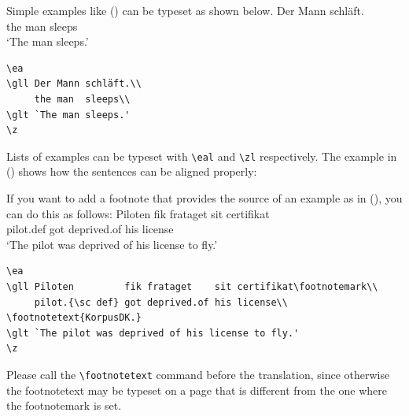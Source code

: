 Simple examples like () can be typeset as shown below.
\ea
{}
\gll Der Mann schläft.\\
     the man  sleeps\\
\glt `The man sleeps.'
\z
\begin{verbatim}
\ea
\gll Der Mann schläft.\\
     the man  sleeps\\
\glt `The man sleeps.'
\z
\end{verbatim}
Lists of examples can be typeset with \verb+\eal+ and \verb+\zl+ respectively. The example in
() shows how the sentences can be aligned properly:
\eal
{}
\zl
\begin{fitverb}
\eal
{}
\zl
\end{fitverb}

If you want to add a footnote that provides the source of an example as in (), you can do
this as follows:
\ea
\gll Piloten         fik frataget    sit certifikat\footnotemark\\
     pilot.{\sc def} got deprived.of his license\\
\glt `The pilot was deprived of his license to fly.'
\z 
\begin{verbatim}
\ea
\gll Piloten         fik frataget    sit certifikat\footnotemark\\
     pilot.{\sc def} got deprived.of his license\\
\footnotetext{KorpusDK.}
\glt `The pilot was deprived of his license to fly.'
\z 
\end{verbatim}
Please call the \verb+\footnotetext+ command before the translation, since otherwise the
footnotetext may be typeset on a page that is different from the one where the footnotemark is set.

